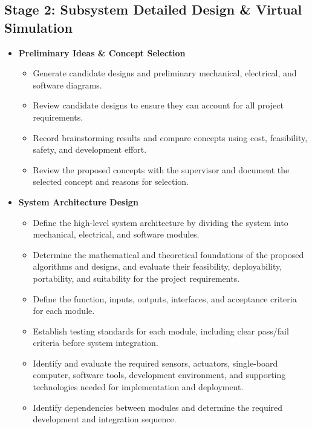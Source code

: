 \documentclass{article}
\begin{document}
\subsection{Stage 2: Subsystem Detailed Design \& Virtual Simulation }
\begin{itemize}
	\item \textbf{Preliminary Ideas \& Concept Selection}
	\begin{itemize}
		\item Generate candidate designs and preliminary mechanical, electrical, and software diagrams.
		\item Review candidate designs to ensure they can account for all project requirements.
		\item Record brainstorming results and compare concepts using cost, feasibility, safety, and development effort.
		\item Review the proposed concepts with the supervisor and document the selected concept and reasons for selection.
	\end{itemize}
	
	\item \textbf{System Architecture Design}
	\begin{itemize}
		\item Define the high-level system architecture by dividing the system into mechanical, electrical, and software modules.
		\item Determine the mathematical and theoretical foundations of the proposed algorithms and designs, and evaluate their feasibility, deployability, portability, and suitability for the project requirements.
		\item Define the function, inputs, outputs, interfaces, and acceptance criteria for each module.
		\item Establish testing standards for each module, including clear pass/fail criteria before system integration.
		\item Identify and evaluate the required sensors, actuators, single-board computer, software tools, development environment, and supporting technologies needed for implementation and deployment.
		\item Identify dependencies between modules and determine the required development and integration sequence.
	\end{itemize}
\end{itemize}
\end{document}
